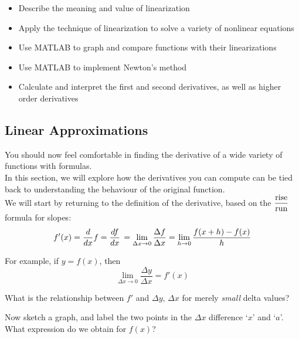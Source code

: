 



\setfont
\pagestyle{fancy}
\renewcommand{\Week}{2 }
\renewcommand{\WeekTitle}{\WeekTitleTwo }

\fancyhead[LE,RO]{Week \Week}  %
\fancyfoot{}
\sectionbox{Week \#\Week: \WeekTitle}


\vspace{5mm}
\goals
\begin{itemize}
\item Describe the meaning and value of linearization
\item Apply the technique of linearization to solve a variety of
  nonlinear equations
\item Use MATLAB to graph and compare functions with their
  linearizations
\item Use MATLAB to implement Newton's method
\item Calculate and interpret the first and second derivatives, as
  well as higher order derivatives
 \end{itemize}

\vspace{5mm}

\newpage
{}
\subsection*{Linear Approximations}

You should now feel comfortable in finding the derivative of a wide
variety of functions with formulas. \\[1ex]

In this section, we will explore how the derivatives you can compute
can be tied back to understanding the behaviour of the original
function. \\[1ex]

We will start by returning to the definition of the derivative, based
on the $\displaystyle \frac{\mbox{rise}}{\mbox{run}}$ formula for slopes: 
\begin{align*} 
  f'(x) = \frac{d}{dx} f = \frac{df}{dx} \, = \lim_{\Delta x \to 0} \frac{\Delta f}{\Delta x} = \lim_{h \to 0} \frac{f(x+h) - f(x)}{h}
\end{align*} 



\newpage 
For example, if $y = f(x)$, then 
\[ \lim_{\Delta x \to 0} \frac{\Delta y}{\Delta x} = f'(x) 
\]
\begin{problem}
 What is the relationship between $f'$ and $\Delta y$,
	$\Delta x$ for merely {\em small} delta values? 
\end{problem}
\vfill
         Now sketch a graph, and label the two points
        in the $\Delta x$ difference `$x$' and `$a$'.  What expression
        do we obtain for $f(x)$?

